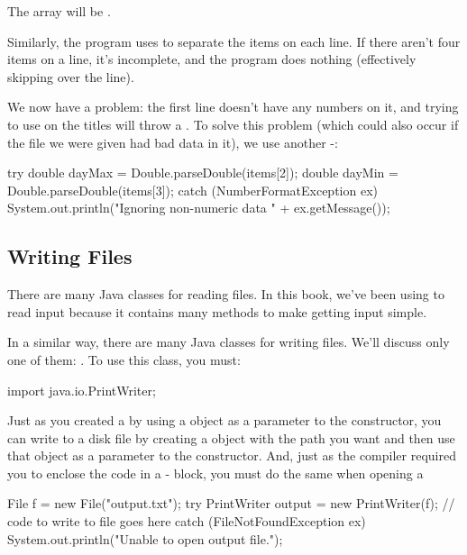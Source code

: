 The  array will be .

Similarly, the program uses  to separate the items on each line. If there aren't four items on a line, it's incomplete, and the program does nothing (effectively skipping over the line).

We now have a problem: the first line doesn't have any numbers on it, and trying to use  on the titles will throw a . To solve this problem (which could also occur if the file we were given had bad data in it), we use another -:

\begin{code}
try {
    double dayMax = Double.parseDouble(items[2]);
    double dayMin = Double.parseDouble(items[3]);
}
catch (NumberFormatException ex) {
    System.out.println("Ignoring non-numeric data "
        + ex.getMessage());
}
\end{code}


\subsection{Writing Files}

There are many Java classes for reading files. In this book, we've been using  to read input because it contains many methods to make getting input simple.

In a similar way, there are many Java classes for writing files. We'll discuss only one of them: . To use this class, you must:

\begin{code}
import java.io.PrintWriter;
\end{code}

Just as you created a  by using a  object as a parameter to the constructor, you can write to a disk file by creating a  object with the path you want and then use that object as a parameter to the  constructor. And, just as the compiler required you to enclose the code in a - block, you must do the same when opening a 

\begin{code}
File f = new File("output.txt");
try {
    PrintWriter output = new PrintWriter(f);
    // code to write to file goes here
}
catch (FileNotFoundException ex) {
    System.out.println("Unable to open output file.");
}
\end{code}

